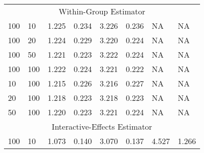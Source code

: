 \documentclass[a4paper]{article}
\begin{document}
\begin{table}[]
\begin{threeparttable}
\begin{tabular}{llllllll}
\multicolumn{8}{c}{Within-Group Estimator}                                                                                                                                                                          \\
100 & 10  & 1.225                                                        & 0.234 & 3.226                                                        & 0.236 & NA                                                       & NA    \\
100 & 20  & 1.224                                                        & 0.229 & 3.220                                                        & 0.224 & NA                                                       & NA    \\
100 & 50  & 1.221                                                        & 0.223 & 3.222                                                        & 0.224 & NA                                                       & NA    \\
100 & 100 & 1.222                                                        & 0.224 & 3.221                                                        & 0.222 & NA                                                       & NA    \\
10  & 100 & 1.215                                                        & 0.226 & 3.216                                                        & 0.227 & NA                                                       & NA    \\
20  & 100 & 1.218                                                        & 0.223 & 3.218                                                        & 0.223 & NA                                                       & NA    \\
50  & 100 & 1.220                                                        & 0.223 & 3.221                                                        & 0.224 & NA                                                       & NA    \\
\multicolumn{8}{c}{Interactive-Effects Estimator}                                                                                                                                                                                       \\
100 & 10  & 1.073                                                        & 0.140 & 3.070                                                        & 0.137 & 4.527                                                    & 1.266 \\

\end{tabular}
\end{threeparttable}
\end{table}
\end{document}
